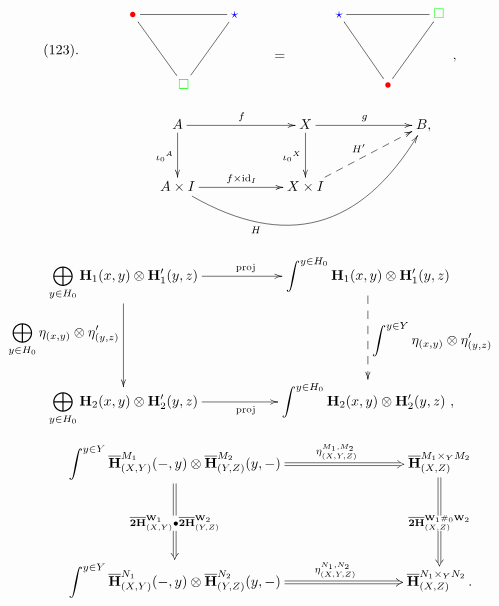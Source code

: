 \documentclass[a4paper,12pt]{article}
\newtheorem{Fundamental Theorem}{Fundamental Theorem}
\def \id {\mathrm{id}}
\newcommand{\tHpb}[3]{{\mathbf{\overline{2H}}^{#1}_{(#2,#3)}}}
\newcommand{\Hpb}{\mathbf{\overline{H}}}
\def \red{\textcolor{red}}
\def \green{\textcolor{green}}
\def \blue{\textcolor{blue}}
\begin{document}
\begin{itemize}
$$\xymatrix@R=1pt{\\\\\\(123).}\xymatrix@R=39pt{ & \red{\bullet}\ar@{-}[dr]  \ar@{-}[rr] && \blue{\star}\ar@{-}[dl] \\
                && \green{\square} }\qquad\xymatrix@R=1pt{\\\\\\\\ =}
\xymatrix@R=39pt{ & \blue{\star}\ar@{-}[dr]  \ar@{-}[rr] && \green{\square}\ar@{-}[dl] \\
                && \red{\bullet} }  \xymatrix@R=1pt{\\\\\\\\ ,}$$

$$\xymatrix@R=30pt@C=60pt
{&A\ar[d]_{{\iota_0}^A}  \ar[r]^f & X\ar[d]_{{\iota_0}^X} \ar[r]^g & B,\\
            & A \times I  \ar@/_4pc/[rru]_<<<<<<<<<<<{H} \ar[r]^{f \times \id_I} & X\times I \ar@{-->}[ur]^{H'} } $$


 $$
\xymatrix
{ &  \displaystyle \bigoplus_{y \in H_0}  \mathbf{H}_1(x,y)\otimes\mathbf{H}_1'(y,z)\ar[dd]_{\displaystyle \bigoplus_{y \in H_0} \eta_{(x,y)} \otimes \eta'_{(y,z)}}  \ar[rr]^{\mathrm{proj}} && \displaystyle  \int^{y \in H_0} \mathbf{H}_1(x,y)\otimes\mathbf{H}_1'(y,z)\ar@{-->}[dd]^{ \displaystyle \int^{y \in Y}   \eta_{(x,y)} \otimes \eta'_{(y,z)} }\\
\\
& \displaystyle \bigoplus_{y \in H_0}  \mathbf{H}_2(x,y)\otimes\mathbf{H}_2'(y,z)  \ar[rr]_{\mathrm{proj}} && \displaystyle \int^{y \in H_0} \mathbf{H}_2(x,y)\otimes\mathbf{H}_2'(y,z)\,\, ,
}
$$
$$\xymatrix{
&\displaystyle\int^{y \in {Y}} \Hpb_{(X,Y)}^{M_1}(-,y) \otimes \Hpb_{(Y,Z)}^{M_2}(y,-)\ar@{=>}[dd]|{\tHpb{\mathbf{W}_1}{X}{Y} \bullet \tHpb{\mathbf{W}_2}{Y}{Z}}
\ar@{=>}[rrr]^>>>>>>>>>>>>>>>>>{\eta_{(X,Y,Z)}^{M_1,M_2}}&&& \Hpb_{(X,Z)}^{M_1\times_Y M_2}
\ar@{=>}[dd]|{\tHpb{\mathbf{W}_1\#_0 \mathbf{W}_2}{X}{Z}}
\\\\
&\displaystyle\int^{y \in {Y}} \Hpb_{(X,Y)}^{N_1}(-, y) \otimes \Hpb_{(Y,Z)}^{N_2}(y,-)\ar@{=>}[rrr]^>>>>>>>>>>>>>>>>>{\eta_{(X,Y,Z)}^{N_1,N_2}}&&& \Hpb_{(X,Z)}^{N_1\times_Y N_2}\,. }
$$



\end{itemize}
\end{document}
